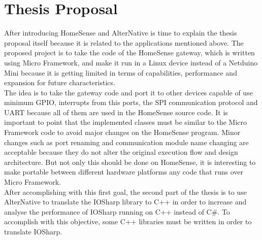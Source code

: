 \section{Thesis Proposal}\label{S:Proposal-Thesis-Proposal}
After introducing HomeSense and AlterNative is time to explain the thesis proposal itself because it is related to the applications mentioned above. The proposed project is to take the code of the HomeSense gateway, which is written using Micro Framework, and make it run in a Linux device instead of a Netduino Mini because it is getting limited in terms of capabilities, performance and expansion for future characteristics.
\\
The idea is to take the gateway code and port it to other devices capable of use minimum GPIO, interrupts from this ports, the SPI communication protocol and UART because all of them are used in the HomeSense source code. It is important to point that the implemented classes must be similar to the Micro Framework code to avoid major changes on the HomeSense program. Minor changes such as port renaming and communication module name changing are acceptable because they do not alter the original execution flow and design architecture. But not only this should be done on HomeSense, it is interesting to make portable between different hardware platforms any code that runs over Micro Framework.
\\
After accomplishing with this first goal, the second part of the thesis is to use AlterNative to translate the IOSharp library to C++ in order to increase and analyse the performance of IOSharp running on C++ instead of C\#. To accomplish with this objective, some C++ libraries must be written in order to translate IOSharp.

